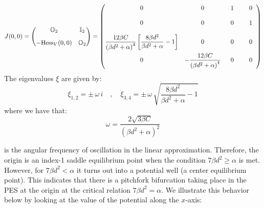 \documentclass[10pt,aps,onecolumn,superscriptaddress]{revtex4-2}
\begin{document}
\begin{equation}
J(0,0) = \begin{pmatrix}
\mathbb{O}_2 & \mathbb{I}_2 \\[.3cm]
-\text{Hess}_{V}(0,0) & \mathbb{O}_2
\end{pmatrix} = \begin{pmatrix}
0 & 0 & \hspace{.2cm} 1 & \hspace{.5cm} 0 \hspace{.2cm} \\[.4cm]
0 & 0 & \hspace{.2cm} 0 & \hspace{.5cm} 1 \hspace{.2cm} \\[.4cm]
\dfrac{12 \beta C}{\left(\beta d^2 + \alpha\right)^4} \left[\dfrac{8\beta d^2}{\beta d^2 + \alpha} - 1\right] & 0 & \hspace{.2cm} 0 & \hspace{.5cm} 0 \hspace{.2cm} \\[.4cm]
0 & -\dfrac{12 \beta C}{\left(\beta d^2 + \alpha\right)^4} & \hspace{.2cm} 0 & \hspace{.5cm} 0 \hspace{.2cm} 
\end{pmatrix}
\end{equation}
The eigenvalues $\xi$ are given by:
\begin{equation}
\xi_{1,2} = \pm \, \omega \, i \quad,\quad \xi_{3,4} = \pm \, \omega \, \sqrt{\dfrac{8\beta d^2}{\beta d^2 + \alpha} - 1}
 \end{equation}
where we have that:
\begin{equation}
\omega = \dfrac{2 \sqrt{3\beta C}}{\left(\beta d^2 + \alpha\right)^2}
\end{equation}

is the angular frequency of oscillation in the linear approximation. Therefore, the origin is an index-1 saddle equilibrium point when the condition $7\beta d^2 \geq \alpha$ is met. However, for $7\beta d^2 < \alpha$ it turns out into a potential well (a center equilibrium point). This indicates that there is a pitchfork bifurcation taking place in the PES at the origin at the critical relation $7\beta d^2 = \alpha$. We illustrate this behavior below by looking at the value of the potential along the $x$-axis:
\end{document}
